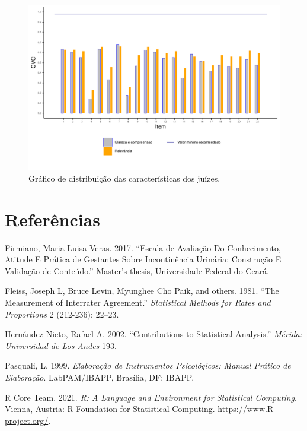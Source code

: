 \documentclass[
]{article}
\newlength{\cslhangindent}
\newenvironment{cslreferences}%
  {\setlength{\parindent}{0pt}%
  \everypar{\setlength{\hangindent}{\cslhangindent}}\ignorespaces}%
  {\par}
\begin{document}
\begin{figure}[htbp]

{\centering \includegraphics[width=0.9\linewidth]{../figures/grafico2_80_perc} 

}

\caption{Gráfico de distribuição das características dos juízes.}\label{fig:grafico2V2}
\end{figure}

\cleardoublepage

\hypertarget{referuxeancias}{%
\section*{Referências}\label{referuxeancias}}

\hypertarget{refs}{}
\begin{cslreferences}
\leavevmode\hypertarget{ref-firmiano2017escala}{}%
Firmiano, Maria Luisa Veras. 2017. ``Escala de Avaliação Do Conhecimento, Atitude E Prática de Gestantes Sobre Incontinência Urinária: Construção E Validação de Conteúdo.'' Master's thesis, Universidade Federal do Ceará.

\leavevmode\hypertarget{ref-fleiss1981measurement}{}%
Fleiss, Joseph L, Bruce Levin, Myunghee Cho Paik, and others. 1981. ``The Measurement of Interrater Agreement.'' \emph{Statistical Methods for Rates and Proportions} 2 (212-236): 22--23.

\leavevmode\hypertarget{ref-hernandez2002contributions}{}%
Hernández-Nieto, Rafael A. 2002. ``Contributions to Statistical Analysis.'' \emph{Mérida: Universidad de Los Andes} 193.

\leavevmode\hypertarget{ref-pasquali1999elaboraccao}{}%
Pasquali, L. 1999. \emph{Elaboração de Instrumentos Psicológicos: Manual Prático de Elaboração}. LabPAM/IBAPP, Brasília, DF: IBAPP.

\leavevmode\hypertarget{ref-Rlang}{}%
R Core Team. 2021. \emph{R: A Language and Environment for Statistical Computing}. Vienna, Austria: R Foundation for Statistical Computing. \url{https://www.R-project.org/}.
\end{cslreferences}
\end{document}
